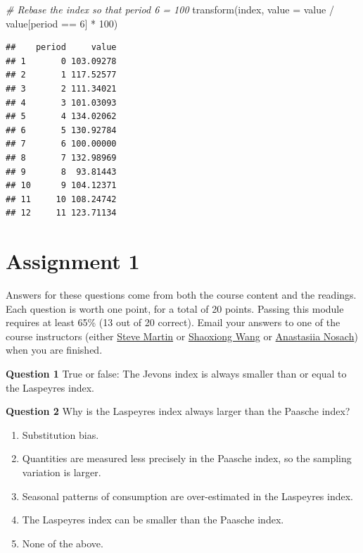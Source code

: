\documentclass[
]{article}
\newenvironment{Shaded}{\begin{snugshade}}{\end{snugshade}}
\newcommand{\AttributeTok}[1]{\textcolor[rgb]{0.77,0.63,0.00}{#1}}
\newcommand{\CommentTok}[1]{\textcolor[rgb]{0.56,0.35,0.01}{\textit{#1}}}
\newcommand{\DecValTok}[1]{\textcolor[rgb]{0.00,0.00,0.81}{#1}}
\newcommand{\FunctionTok}[1]{\textcolor[rgb]{0.00,0.00,0.00}{#1}}
\newcommand{\NormalTok}[1]{#1}
\newcommand{\SpecialCharTok}[1]{\textcolor[rgb]{0.00,0.00,0.00}{#1}}
\begin{document}
\begin{Shaded}
\begin{Highlighting}[]
\CommentTok{\# Rebase the index so that period 6 = 100}
\FunctionTok{transform}\NormalTok{(index, }\AttributeTok{value =}\NormalTok{ value }\SpecialCharTok{/}\NormalTok{ value[period }\SpecialCharTok{==} \DecValTok{6}\NormalTok{] }\SpecialCharTok{*} \DecValTok{100}\NormalTok{)}
\end{Highlighting}
\end{Shaded}

\begin{verbatim}
##    period     value
## 1       0 103.09278
## 2       1 117.52577
## 3       2 111.34021
## 4       3 101.03093
## 5       4 134.02062
## 6       5 130.92784
## 7       6 100.00000
## 8       7 132.98969
## 9       8  93.81443
## 10      9 104.12371
## 11     10 108.24742
## 12     11 123.71134
\end{verbatim}

\hypertarget{assignment-1}{%
\section{Assignment 1}\label{assignment-1}}

Answers for these questions come from both the course content and the readings. Each question is worth one point, for a total of 20 points. Passing this module requires at least 65\% (13 out of 20 correct). Email your answers to one of the course instructors (either \href{mailto:steve.martin5@canada.ca}{Steve Martin} or \href{mailto:shaoxiong.wang@canada.ca}{Shaoxiong Wang} or \href{mailto:anastasiia.nosach@canada.ca}{Anastasiia Nosach}) when you are finished.

\textbf{Question 1} True or false: The Jevons index is always smaller than or equal to the Laspeyres index.

\textbf{Question 2} Why is the Laspeyres index always larger than the Paasche index?

\begin{enumerate}
\def\labelenumi{\alph{enumi})}
\item
  Substitution bias.
\item
  Quantities are measured less precisely in the Paasche index, so the sampling variation is
  larger.
\item
  Seasonal patterns of consumption are over-estimated in the Laspeyres index.
\item
  The Laspeyres index can be smaller than the Paasche index.
\item
  None of the above.
\end{enumerate}
\end{document}
